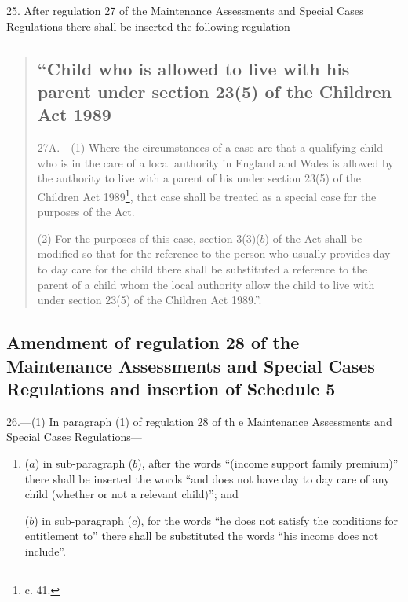\documentclass[a4paper]{article}
\begin{document}
25.  After regulation 27 of the Maintenance Assessments and Special Cases Regulations there shall be inserted the following regulation---
\begin{quotation}
\subsection*{“Child who is allowed to live with his parent under section 23(5) of the Children Act 1989}

27A.—(1) Where the circumstances of a case are that a qualifying child who is in the care of a local authority in England and Wales is allowed by the authority to live with a parent of his under section 23(5) of the Children Act 1989\footnote{ c. 41.}, that case shall be treated as a special case for the purposes of the Act.

(2) For the purposes of this case, section 3(3)($b$) of the Act shall be modified so that for the reference to the person who usually provides day to day care for the child there shall be substituted a reference to the parent of a child whom the local authority allow the child to live with under section 23(5) of the Children Act 1989.”.
\end{quotation}

\subsection[26. Amendment of regulation 28 of the Maintenance Assessments and Special Cases Regulations and insertion of Schedule 5]{\sloppy Amendment of regulation 28 of the Maintenance Assessments and Special Cases Regulations and insertion of Schedule 5}

26.—(1) In paragraph (1) of regulation 28 of th
e Maintenance Assessments and Special Cases Regulations---
\begin{enumerate}\item[]
($a$) in sub-paragraph ($b$), after the words “(income support family premium)” there shall be inserted the words “and does not have day to day care of any child (whether or not a relevant child)”; and

($b$) in sub-paragraph ($c$), for the words “he does not satisfy the conditions for entitlement to” there shall be substituted the words “his income does not include”.
\end{enumerate}
\end{document}
